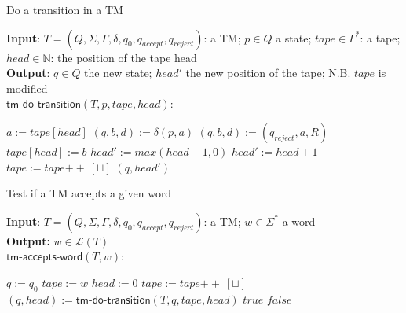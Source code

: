 \documentclass[11pt]{article}
\newcommand*{\Language}[1]{\ensuremath{\mathcal{L}(#1)}}
\newcommand{\concat}{\ensuremath{+\!\!+\:}}
\newcommand{\blank}{\ensuremath{\sqcup}}
\begin{document}
\begin{algorithm}
\small
\caption{Do a transition in a TM}
\vspace*{1ex}
{\textbf{Input}:}
$T = (Q, \Sigma, \Gamma, \delta, q_0, q_{accept}, q_{reject})$: a TM;
$p \in Q$ a state;
$tape \in \Gamma^*$: a tape; $head \in \mathbb{N}$: the position of the tape head \\
{\textbf{Output}:}
$q \in Q$ the new state; $head'$ the new position of the tape; N.B. $tape$ is modified\\

$\textsf{tm-do-transition}(T, p, tape, head)$:
\begin{algorithmic}[1]
\State $a := tape[head]$
  \State $(q, b, d) := \delta(p, a)$
\Else
  \State $(q, b, d) := (q_{reject}, a, R)$
\EndIf
\State $tape[head] := b$
  \State $head' := max(head - 1, 0)$
  \State $head' := head + 1$
\EndIf
{}
  \State $tape := tape \concat [ \blank ]$ 
\EndIf
\State \Return $(q, head')$
\end{algorithmic}
\end{algorithm}

\begin{algorithm}
\small
\caption{Test if a TM accepts a given word }
\vspace*{1ex}
{\textbf{Input}:} 
$T = (Q, \Sigma, \Gamma, \delta, q_0, q_{accept}, q_{reject})$: a TM; $w \in \Sigma^*$ a word \\
\textbf{Output:}
$w \in \Language{T}$ \\

$\textsf{tm-accepts-word}(T, w)$:
\begin{algorithmic}[1]
\State $q := q_0$
\State $tape := w$
\State $head := 0$
  \State $tape := tape \concat [ \blank ]$ 
\EndIf
{}
  \State $(q, head) := \textsf{tm-do-transition}(T, q, tape, head)$
    \State \Return $true$
  \EndIf
    \State \Return $false$
  \EndIf
\EndWhile
\end{algorithmic}
\end{algorithm}
\end{document}
